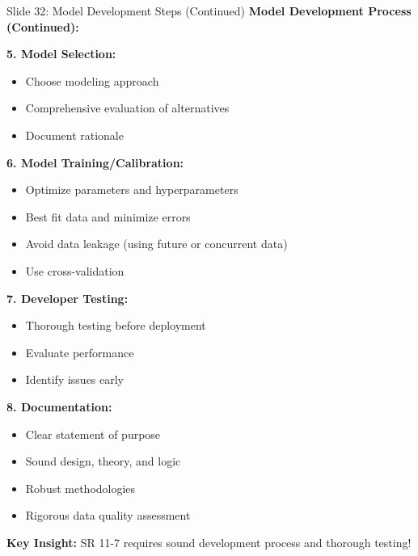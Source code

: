\documentclass[8pt]{beamer}
\begin{document}
	\begin{frame}{Slide 32: Model Development Steps (Continued)}
		\fontsize{6.5}{7.5}\selectfont
		\textbf{Model Development Process (Continued):}
		
		\vspace{0.1cm}
		\textbf{5. Model Selection:}
		\begin{itemize}
			\item Choose modeling approach
			\item Comprehensive evaluation of alternatives
			\item Document rationale
		\end{itemize}
		
		\vspace{0.1cm}
		\textbf{6. Model Training/Calibration:}
		\begin{itemize}
			\item Optimize parameters and hyperparameters
			\item Best fit data and minimize errors
			\item Avoid data leakage (using future or concurrent data)
			\item Use cross-validation
		\end{itemize}
		
		\vspace{0.1cm}
		\textbf{7. Developer Testing:}
		\begin{itemize}
			\item Thorough testing before deployment
			\item Evaluate performance
			\item Identify issues early
		\end{itemize}
		
		\vspace{0.1cm}
		\textbf{8. Documentation:}
		\begin{itemize}
			\item Clear statement of purpose
			\item Sound design, theory, and logic
			\item Robust methodologies
			\item Rigorous data quality assessment
		\end{itemize}
		
		\textcolor{myblue}{\textbf{Key Insight:}} SR 11-7 requires \textcolor{myblue}{sound development process and thorough testing}!
	\end{frame}
	
\end{document}
